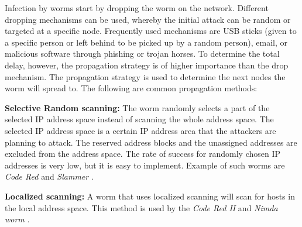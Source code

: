 Infection by worms start by dropping the worm on the network. Different dropping mechanisms can be used, whereby the initial attack can be random or targeted at a specific node. Frequently used mechanisms are USB sticks (given to a specific person or left behind to be picked up by a random person), email, or malicious software through phishing or trojan horses. To determine the total delay, however, the propagation strategy is of higher importance than the drop mechanism. The propagation strategy is used to determine the next nodes the worm will spread to. The following are common propagation methods: 
\begin{description}

\item \textbf{Selective Random scanning:} The worm randomly  selects a part of the selected IP address space instead of scanning the whole address space. The selected IP address space is a certain IP address area that the attackers are planning to attack. The reserved address blocks and the unassigned addresses are excluded from the address space. The rate of success for randomly chosen IP addresses is very low, but it is easy to implement. Example of such worms are \textit{Code Red} \citep{OwnInternetSI} and \textit{Slammer} \citep{moore2003inside}. 


\item \textbf{Localized scanning:} A worm that uses localized scanning will scan for hosts in the local address space. This method is used by the \textit{Code Red II} \citep{OwnInternetSI} and \textit{Nimda worm} \citep{OwnInternetSI}.



\end{description}

